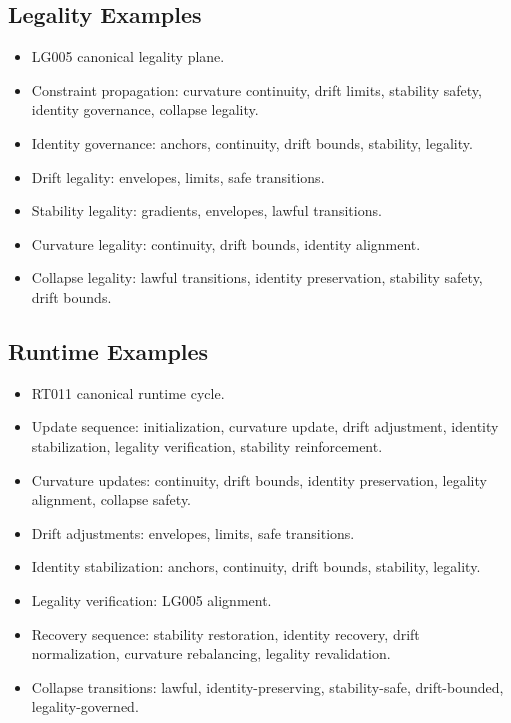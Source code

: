 \subsection{Legality Examples}
\begin{itemize}
    \item LG005 canonical legality plane.
    \item Constraint propagation: curvature continuity, drift limits, stability safety, identity governance, collapse legality.
    \item Identity governance: anchors, continuity, drift bounds, stability, legality.
    \item Drift legality: envelopes, limits, safe transitions.
    \item Stability legality: gradients, envelopes, lawful transitions.
    \item Curvature legality: continuity, drift bounds, identity alignment.
    \item Collapse legality: lawful transitions, identity preservation, stability safety, drift bounds.
\end{itemize}

\subsection{Runtime Examples}
\begin{itemize}
    \item RT011 canonical runtime cycle.
    \item Update sequence: initialization, curvature update, drift adjustment, identity stabilization, legality verification, stability reinforcement.
    \item Curvature updates: continuity, drift bounds, identity preservation, legality alignment, collapse safety.
    \item Drift adjustments: envelopes, limits, safe transitions.
    \item Identity stabilization: anchors, continuity, drift bounds, stability, legality.
    \item Legality verification: LG005 alignment.
    \item Recovery sequence: stability restoration, identity recovery, drift normalization, curvature rebalancing, legality revalidation.
    \item Collapse transitions: lawful, identity-preserving, stability-safe, drift-bounded, legality-governed.
\end{itemize}

